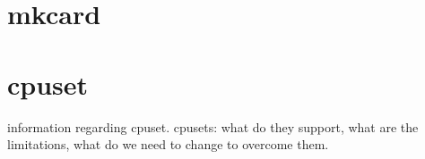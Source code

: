 \appendix

\section{mkcard}
\label{appendix:mkcard}



\section{cpuset}
\label{appendix:cpuset}

information regarding cpuset. cpusets: what do they support, what are the limitations, what do we need to change to overcome them.

